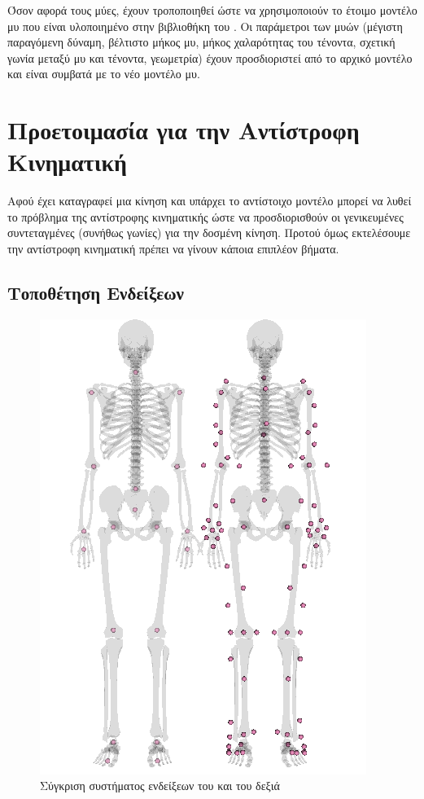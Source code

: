 Όσον αφορά τους μύες, έχουν τροποποιηθεί ώστε να χρησιμοποιούν το έτοιμο μοντέλο μυ  που είναι υλοποιημένο στην βιβλιοθήκη του . Οι παράμετροι των μυών (μέγιστη παραγόμενη δύναμη, βέλτιστο μήκος μυ, μήκος χαλαρότητας του τένοντα, σχετική γωνία μεταξύ μυ και τένοντα, γεωμετρία) έχουν προσδιοριστεί από το αρχικό μοντέλο και είναι συμβατά με το νέο μοντέλο μυ.

\section{Προετοιμασία για την Αντίστροφη Κινηματική}

Αφού έχει καταγραφεί μια κίνηση και υπάρχει το αντίστοιχο μοντέλο μπορεί να λυθεί το πρόβλημα της αντίστροφης κινηματικής ώστε να προσδιορισθούν οι γενικευμένες συντεταγμένες (συνήθως γωνίες) για την δοσμένη κίνηση. Προτού όμως εκτελέσουμε την αντίστροφη κινηματική πρέπει να γίνουν κάποια επιπλέον βήματα.

\subsection{Τοποθέτηση Ενδείξεων}

\begin{figure}[H]
    \centering
    \includegraphics[height=0.6\textheight, keepaspectratio]{fig/kinect-vicon-markers.png}
    \caption{Σύγκριση συστήματος ενδείξεων του  και του  δεξιά}
    \label{fig:kinect-vicon-markers}
\end{figure}

